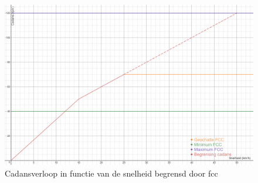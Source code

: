 \begin{figure}
  \includegraphics[width=\linewidth]{images/cadansverloop.png}
  \caption{Cadansverloop in functie van de snelheid begrensd door fcc}
  \label{fig:cadansverloop}
\end{figure}
\newpage
